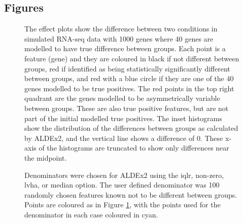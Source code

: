 \documentclass{bmcart}
\def\texttt{[image: ]}
\begin{document}
\begin{backmatter}


\section*{Figures}

\begin{figure}[h!]
\caption{ The effect plots show the difference between two conditions in simulated RNA-seq data with 1000 genes where 40 genes are modelled to have true difference between groups. Each point is a feature (gene) and they are coloured in black if not different between groups, red if identified as being statistically significantly different between groups, and red with a blue circle if they are one of the 40  genes modelled to be  true positives. The red points in the top right quadrant are the genes modelled to be asymmetrically variable between groups. These are also true positive features, but are not part of the initial modelled true positives. The inset histograms show the distribution of the differences between groups as calculated by ALDEx2, and the vertical line shows a difference of 0. These x-axis of the histograms are truncated to show only differences near the midpoint.}
\label{Fig:f1a}
\end{figure}

\begin{figure}[h!]
\caption{ Denominators were chosen for ALDEx2 using the iqlr, non-zero, lvha, or median option. The user defined denominator was 100 randomly chosen features known not to be different between groups. Points are coloured as in Figure \ref{Fig:f1a}, with the points used for the denominator in each case coloured in cyan.}
\label{Fig:f2a}
\end{figure}


\end{backmatter}
\end{document}
